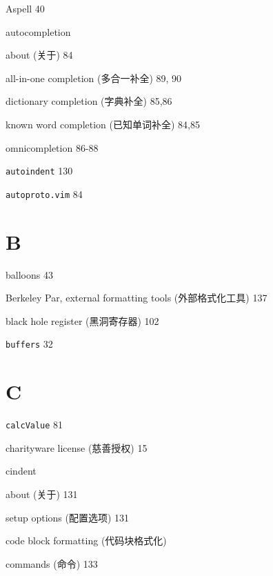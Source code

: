 \begin{multicols}{2}
\hangindent=2pc  Aspell 40

\hangindent=2pc  autocompletion \par
\hangindent=2pc \quad about (关于) 84 \par
\hangindent=2pc \quad all-in-one completion (多合一补全) 89, 90 \par
\hangindent=2pc \quad dictionary completion (字典补全) 85,86 \par
\hangindent=2pc \quad known word completion (已知单词补全) 84,85 \par
\hangindent=2pc \quad omnicompletion 86-88 \par

\hangindent=2pc  \texttt{autoindent} 130

\hangindent=2pc  \texttt{autoproto.vim} 84

\hangindent=2pc  \section*{B}

\hangindent=2pc  balloons 43

\hangindent=2pc  Berkeley Par, external formatting tools (外部格式化工具) 137

\hangindent=2pc  black hole register (黑洞寄存器) 102

\hangindent=2pc  \texttt{buffers} 32

\hangindent=2pc  \section*{C}

\hangindent=2pc  \texttt{calcValue} 81

\hangindent=2pc  charityware license (慈善授权) 15

\hangindent=2pc  cindent \par
\hangindent=2pc \quad about (关于) 131 \par
\hangindent=2pc \quad setup options (配置选项) 131 \par

\hangindent=2pc  code block formatting (代码块格式化) \par
\hangindent=2pc \quad commands (命令) 133 \par


\end{multicols}
